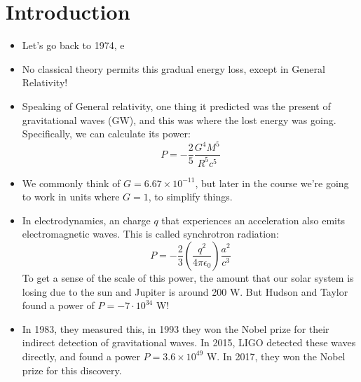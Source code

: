 \section{Introduction}
\begin{itemize}
	\item Let's go back to 1974, e
	\item No classical theory permits this gradual energy loss, except in General Relativity!
	\item Speaking of General relativity, one thing it predicted was the present of gravitational waves (GW), and 
		this was where the lost energy was going. Specifically, we can calculate its power:
		\[
		P = -\frac{2}{5}\frac{G^{4}M^{5}}{R^{5}c^{5}}
		\] 
	\item We commonly think of \( G = 6.67 \times 10^{-11}\), but later in the course we're going to work in units 
		where \( G = 1 \), to simplify things. 
	\item In electrodynamics, an charge \( q \) that experiences an acceleration also emits electromagnetic waves. This
		is called synchrotron radiation:
		\[
			P = -\frac{2}{3} \left( \frac{q^2}{4\pi \epsilon_0} \right) \frac{a^2}{c^3}
		\] 
		To get a sense of the scale of this power, the amount that our solar system is losing due to the sun and 
		Jupiter is around 200 W. But Hudson and Taylor found a power of \( P = -7 \cdot 10^{34} \) W!
	\item In 1983, they measured this, in 1993 they won the Nobel prize for their indirect detection of 
		gravitational waves. In 2015, LIGO detected these waves directly, and found a power 
		\( P = 3.6 \times 10^{49} \) W. In 2017, they won the Nobel prize for this discovery. 
\end{itemize}
